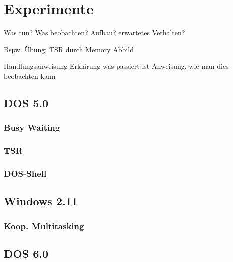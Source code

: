 \chapter{Experimente}
\label{chap:challenges}

Was tun?
Was beobachten?
Aufbau?
erwartetes Verhalten?

Bspw. Übung: TSR durch Memory Abbild


Handlungsanweisung
Erklärung was passiert ist
Anweisung, wie man dies beobachten kann

\section{DOS 5.0}

	\subsection{Busy Waiting}
	\subsection{TSR}
	\subsection{DOS-Shell}

\section{Windows 2.11}

	\subsection{Koop. Multitasking}

\section{DOS 6.0}

